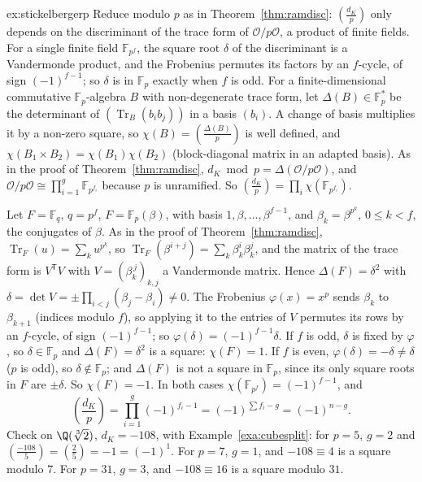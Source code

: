 \begin{solution}{ex:stickelbergerp}
\idea Reduce modulo $p$ as in Theorem~\ref{thm:ramdisc}: $\left(\frac{d_K}p\right)$ only depends on the discriminant of
the trace form of $\mathcal O/p\mathcal O$, a product of finite fields. For a single finite field $\mathbb F_{p^f}$,
the square root $\delta$ of the discriminant is a Vandermonde product, and the Frobenius permutes its factors by an
$f$-cycle, of sign $(-1)^{f-1}$; so $\delta$ is in $\mathbb F_p$ exactly when $f$ is odd.
\writeup For a finite-dimensional commutative $\mathbb F_p$-algebra $B$ with non-degenerate trace form, let
$\Delta(B)\in\mathbb F_p^*$ be the determinant of $(\operatorname{Tr}_B(b_ib_j))$ in a basis $(b_i)$. A change of basis
multiplies it by a non-zero square, so $\chi(B)=\left(\frac{\Delta(B)}p\right)$ is well defined, and $\chi(B_1\times
B_2)=\chi(B_1)\chi(B_2)$ (block-diagonal matrix in an adapted basis). As in the proof of Theorem~\ref{thm:ramdisc}, $d_K
\bmod p=\Delta(\mathcal O/p\mathcal O)$, and $\mathcal O/p\mathcal O\cong\prod_{i=1}^g\mathbb F_{p^{f_i}}$ because $p$ is
unramified. So $\left(\frac{d_K}p\right)=\prod_i\chi(\mathbb F_{p^{f_i}})$.

Let $F=\mathbb F_{q}$, $q=p^f$, $F=\mathbb F_p(\beta)$, with basis $1,\beta,\dots,\beta^{f-1}$, and $\beta_k=\beta^{p^k}$,
$0\le k<f$, the conjugates of $\beta$. As in the proof of Theorem~\ref{thm:ramdisc}, $\operatorname{Tr}_F(u)=\sum_ku^{p^k}$,
so $\operatorname{Tr}_F(\beta^{i+j})=\sum_k\beta_k^i\beta_k^j$, and the matrix of the trace form is $V^{\mathsf T}V$ with
$V=(\beta_k^{\,j})_{k,j}$ a Vandermonde matrix. Hence $\Delta(F)=\delta^2$ with $\delta=\det V=\pm\prod_{i<j}(\beta_j-
\beta_i)\ne0$. The Frobenius $\varphi(x)=x^p$ sends $\beta_k$ to $\beta_{k+1}$ (indices modulo $f$), so applying it to
the entries of $V$ permutes its rows by an $f$-cycle, of sign $(-1)^{f-1}$; so $\varphi(\delta)=(-1)^{f-1}\delta$. If $f$
is odd, $\delta$ is fixed by $\varphi$, so $\delta\in\mathbb F_p$ and $\Delta(F)=\delta^2$ is a square: $\chi(F)=1$. If
$f$ is even, $\varphi(\delta)=-\delta\ne\delta$ ($p$ is odd), so $\delta\notin\mathbb F_p$; and $\Delta(F)$ is not a square
in $\mathbb F_p$, since its only square roots in $F$ are $\pm\delta$. So $\chi(F)=-1$. In both cases
$\chi(\mathbb F_{p^f})=(-1)^{f-1}$, and
\[
\left(\frac{d_K}p\right)=\prod_{i=1}^g(-1)^{f_i-1}=(-1)^{\sum f_i-g}=(-1)^{n-g}.
\]
Check on $\Q(\sqrt[3]2)$, $d_K=-108$, with Example~\ref{exa:cubesplit}: for $p=5$, $g=2$ and $\left(\frac{-108}5\right)=
\left(\frac25\right)=-1=(-1)^1$. For $p=7$, $g=1$, and $-108\equiv4$ is a square modulo $7$. For $p=31$, $g=3$, and
$-108\equiv16$ is a square modulo $31$.
\end{solution}

